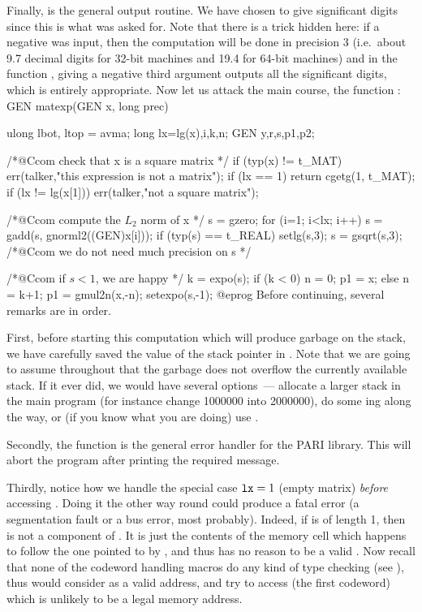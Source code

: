 Finally,  is the general output routine. We have chosen to give
 significant digits since this is what was asked for. Note that there
is a trick hidden here: if a negative  was input, then the computation
will be done in precision 3 (i.e.~about 9.7 decimal digits for 32-bit
machines and 19.4 for 64-bit machines) and in the function , giving
a negative third argument outputs all the significant digits, which is entirely
appropriate. Now let us attack the main course, the function :
%
\bprog
GEN
matexp(GEN x, long prec)
{
  ulong lbot, ltop = avma;
  long lx=lg(x),i,k,n;
  GEN y,r,s,p1,p2;

  /*@Ccom check that x is a square matrix */
  if (typ(x) != t_MAT) err(talker,"this expression is not a matrix");
  if (lx == 1) return cgetg(1, t_MAT);
  if (lx != lg(x[1])) err(talker,"not a square matrix");

  /*@Ccom compute the $L_2$ norm of x */
  s = gzero;
  for (i=1; i<lx; i++)
    s = gadd(s, gnorml2((GEN)x[i]));
  if (typ(s) == t_REAL) setlg(s,3);
  s = gsqrt(s,3); /*@Ccom we do not need much precision on s */

  /*@Ccom if $s<1$, we are happy */
  k = expo(s);
  if (k < 0) { n = 0; p1 = x; }
  else { n = k+1; p1 = gmul2n(x,-n); setexpo(s,-1); }@eprog
\noindent
Before continuing, several remarks are in order.

First, before starting this computation which will produce garbage on the
stack, we have carefully saved the value of the stack pointer  in
. Note that we are going to assume throughout that the garbage does
not overflow the currently available stack. If it ever did, we would
have several options~--- allocate a larger stack in the main program (for
instance change 1000000 into 2000000), do some ing along the
way, or (if you know what you are doing) use .

Secondly, the  function is the general error handler for the
PARI library. This will abort the program after printing the required
message.

Thirdly, notice how we handle the special case ${\tt lx} = 1$ (empty matrix)
{\it before\/} accessing . Doing it the other way round could
produce a fatal error (a segmentation fault or a bus error, most probably).
Indeed, if  is of length 1, then  is not a component of
. It is just the contents of the memory cell which happens to follow
the one pointed to by , and thus has no reason to be a valid .
Now recall that none of the codeword handling macros do any kind of type
checking (see ), thus  would consider 
as a valid address, and try to access  (the first codeword)
which is unlikely to be a legal memory address.

}
